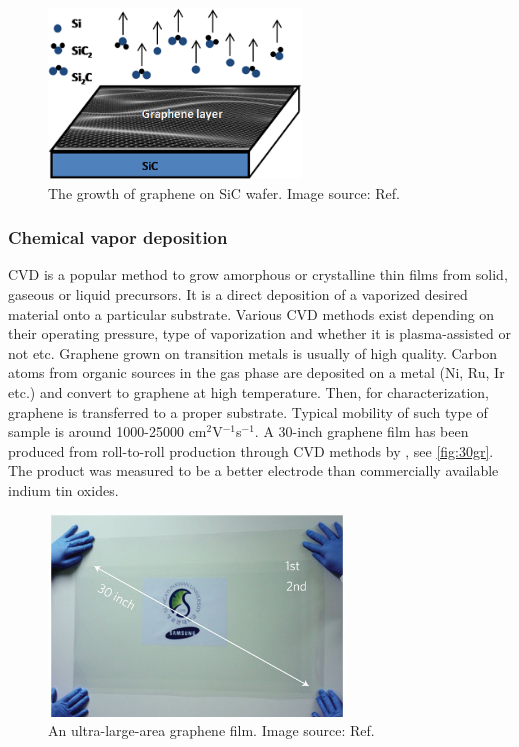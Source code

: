 \begin{figure}[htbp!] 
\centering  
\includegraphics[width=0.6\textwidth]{gr-sic.png}
\caption[The growth of graphene on SiC wafer]{The growth of graphene on SiC wafer. Image source: Ref. \cite{Mishra2016}}  
\label{fig:sic}
\end{figure} 

\subsubsection{Chemical vapor deposition}

CVD is a popular method to grow amorphous or crystalline thin films from solid, gaseous or liquid precursors. It is a direct deposition of a vaporized desired material onto a particular substrate. Various CVD methods exist depending on their operating pressure, type of vaporization and whether it is plasma-assisted or not etc. Graphene grown on transition metals is usually of high quality. Carbon atoms from organic sources in the gas phase are deposited on a metal (Ni, Ru, Ir etc.) and convert to graphene at high temperature. Then, for characterization, graphene is transferred to a proper substrate. Typical mobility of such type of sample is around 1000-25000 cm$^2$V$^{-1}$s$^{-1}$\cite{Petrone2012}. A 30-inch graphene film has been produced from roll-to-roll production through CVD methods by \citet{Bae2010}, see \autoref{fig:30gr}. The product was measured to be a better electrode than commercially available indium tin oxides.

\begin{figure}[htbp!] 
\centering  
\includegraphics[width=0.7\textwidth]{30-inches-gr.jpg}
\caption[An ultra-large-area graphene film]{An ultra-large-area graphene film. Image source: Ref. \cite{Bae2010}}  
\label{fig:30gr}
\end{figure} 

